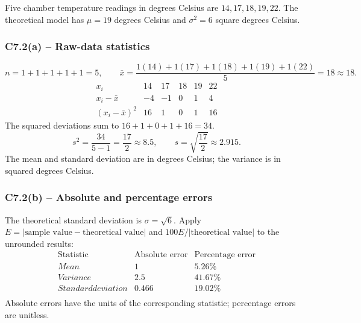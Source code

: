 {
Five chamber temperature readings in degrees Celsius are $14,17,18,19,22$.
The theoretical model has $\mu=19$ degrees Celsius and $\sigma^2=6$ square degrees Celsius.
\label{sol:c7-2a}
\subsubsection*{C7.2(a) -- Raw-data statistics }
\[
n=1+1+1+1+1=5,\qquad
\bar{x}=\frac{1(14)+1(17)+1(18)+1(19)+1(22)}{5}=18\approx18.
\]
\[
\begin{array}{c|rrrrr}
x_i&14&17&18&19&22\\\hline
x_i-\bar{x}&-4&-1&0&1&4\\
(x_i-\bar{x})^2&16&1&0&1&16
\end{array}
\]
The squared deviations sum to $16+1+0+1+16=34$.
\[
s^2=\frac{34}{5-1}=\frac{17}{2}\approx8.5,\qquad
s=\sqrt{\frac{17}{2}}\approx2.915.
\]
The mean and standard deviation are in degrees Celsius; the variance is in squared degrees Celsius.

\label{sol:c7-2b}
\subsubsection*{C7.2(b) -- Absolute and percentage errors }
The theoretical standard deviation is $\sigma=\sqrt{6}$.
Apply $E=|\text{sample value}-\text{theoretical value}|$ and
$100E/|\text{theoretical value}|$ to the unrounded results:
\[
\begin{array}{l|rr}
\text{Statistic}&\text{Absolute error}&\text{Percentage error}\\\hline
Mean&1\phantom{.000}&5.26\%\\
Variance&2.5\phantom{00}&41.67\%\\
Standard deviation&0.466&19.02\%\\
\end{array}
\]
Absolute errors have the units of the corresponding statistic; percentage errors are unitless.
\secInicio[sec:c7-2]

}

